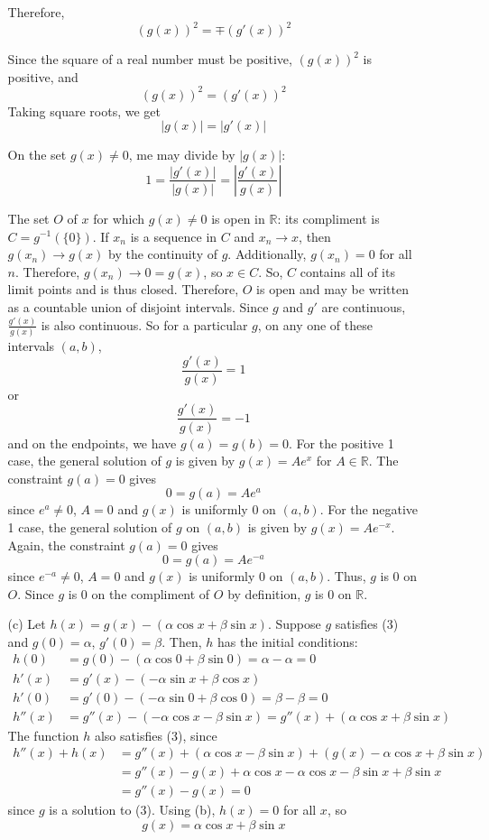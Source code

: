 \documentclass[12pt]{amsart}
\theoremstyle{definition}
\theoremstyle{remark}
\newcommand{\abs}[1]{\left\lvert#1\right\rvert}
\begin{document}
\begin{itemize}
\begin{itemize}
  
  Therefore, $$(g(x))^{2}=\mp(g'(x))^{2}$$

  Since the square of a real number must be positive, $(g(x))^2$ is positive, and $$(g(x))^2=(g'(x))^2$$Taking square roots, we get $$|g(x)|=|g'(x)|$$

  On the set $g(x)\ne0$, me may divide by $|g(x)|$: $$1=\frac{|g'(x)|}{\abs{g(x)}}=\abs{\frac{g'(x)}{g(x)}}$$

  The set $O$ of $x$ for which $g(x)\ne0$ is open in $\mathbb{R}$: its compliment is $C=g^{-1}(\{0\})$. If $x_n$ is a sequence in $C$ and $x_n\rightarrow x$, then $g(x_n)\rightarrow g(x)$ by the continuity of $g$. Additionally, $g(x_n)=0$ for all $n$. Therefore, $g(x_n)\rightarrow0=g(x)$, so $x\in C$. So, $C$ contains all of its limit points and is thus closed. Therefore, $O$ is open and may be written as a countable union of disjoint intervals. Since $g$ and $g'$ are continuous, $\frac{g'(x)}{g(x)}$ is also continuous. So for a particular $g$, on any one of these intervals $(a,b)$, $$\frac{g'(x)}{g(x)}=1$$or $$\frac{g'(x)}{g(x)}=-1$$and on the endpoints, we have $g(a)=g(b)=0$. For the positive 1 case, the general solution of $g$ is given by $g(x)=Ae^x$ for $A\in\mathbb{R}$. The constraint $g(a)=0$ gives $$0=g(a)=Ae^a$$since $e^a\ne0$, $A=0$ and $g(x)$ is uniformly 0 on $(a,b)$. For the negative 1 case, the general solution of $g$ on $(a,b)$ is given by $g(x)=Ae^{-x}$. Again, the constraint $g(a)=0$ gives $$0=g(a)=Ae^{-a}$$since $e^{-a}\ne0$, $A=0$ and $g(x)$ is uniformly 0 on $(a,b)$. Thus, $g$ is 0 on $O$. Since $g$ is 0 on the compliment of $O$ by definition, $g$ is 0 on $\mathbb{R}$.

\vspace{0.1 cm}

\item[(c)] Let $h(x)=g(x)-(\alpha\cos x+\beta\sin x)$. Suppose $g$ satisfies (3) and $g(0)=\alpha$, $g'(0)=\beta$. Then, $h$ has the initial conditions: \begin{align*}
  h(0)&= g(0)-(\alpha \cos0+\beta\sin0)=\alpha-\alpha=0\\
  h'(x)&= g'(x)-(-\alpha\sin x+\beta\cos x)\\
  h'(0)&= g'(0)-(-\alpha\sin0+\beta\cos0)=\beta-\beta=0\\
  h''(x)&= g''(x)-(-\alpha\cos x-\beta\sin x)=g''(x)+(\alpha\cos x+\beta\sin x)
  \end{align*}The function $h$ also satisfies (3), since \begin{align*}h''(x)+h(x)&= g''(x)+(\alpha\cos x-\beta\sin x)+(g(x)- \alpha\cos x+\beta\sin x)\\
  &= g''(x)-g(x)+\alpha\cos x-\alpha\cos x-\beta\sin x+\beta\sin x\\
  &= g''(x)-g(x)=0
  \end{align*}since $g$ is a solution to (3). Using (b), $h(x)=0$ for all $x$, so $$g(x)=\alpha\cos x+\beta\sin x$$


\end{itemize}
\end{itemize}
\end{document}
